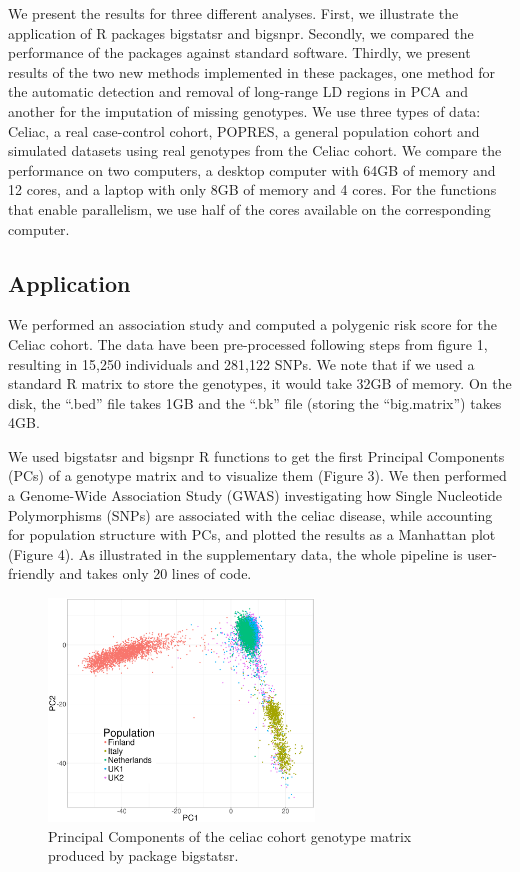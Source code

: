 \documentclass{bioinfo}
\begin{document}
We present the results for three different analyses. First, we illustrate the application of R packages bigstatsr and bigsnpr. Secondly, we compared the performance of the packages against standard software. Thirdly, we present results of the two new methods implemented in these packages, one method for the automatic detection and removal of long-range LD regions in PCA and another for the imputation of missing genotypes. We use three types of data: Celiac, a real case-control cohort, POPRES, a general population cohort and simulated datasets using real genotypes from the Celiac cohort. We compare the performance on two computers, a desktop computer with 64GB of memory and 12 cores, and a laptop with only 8GB of memory and 4 cores. For the functions that enable parallelism, we use half of the cores available on the corresponding computer.

\subsection{Application}
 
We performed an association study and computed a polygenic risk score for the Celiac cohort. The data have been pre-processed following steps from figure 1, resulting in 15,250 individuals and 281,122 SNPs. We note that if we used a standard R matrix to store the genotypes, it would take 32GB of memory. On the disk, the ``.bed'' file takes 1GB and the ``.bk'' file (storing the ``big.matrix'') takes 4GB. 

We used bigstatsr and bigsnpr R functions to get the first Principal Components (PCs) of a genotype matrix and to visualize them (Figure 3). We then performed a Genome-Wide Association Study (GWAS) investigating how Single Nucleotide Polymorphisms (SNPs) are associated with the celiac disease, while accounting for population structure with PCs, and plotted the results as a Manhattan plot (Figure 4). As illustrated in the supplementary data, the whole pipeline is user-friendly and takes only 20 lines of code.


\begin{figure}[!tpb]
\centerline{\includegraphics[width=200pt]{celiac-pca}}
\caption{Principal Components of the celiac cohort genotype matrix produced by package bigstatsr.}\label{fig:pca}
\end{figure}
\end{document}

